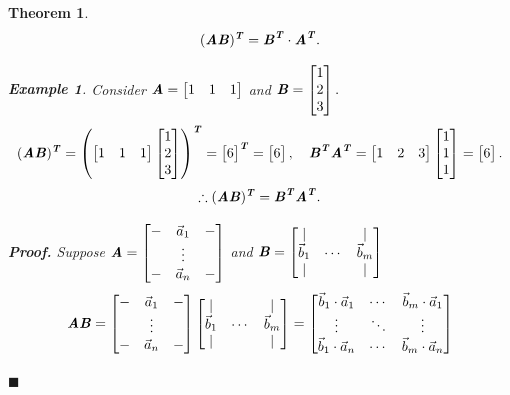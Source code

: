 \documentclass[12pt, a4paper]{article}
\newtheorem{thm}{Theorem}[subsection]
\newtheorem{eg}{Example}[subsection]
\newenvironment*{prf}{\indent\textbf{\textit{Proof. }}}{\hfill $\blacksquare$\par}
\def\T{{\textbf{\emph{T}}}}
\def\veca{\vec{a}}
\def\vecb{\vec{b}}
\def\matrixA{\textbf{\emph{A}}}
\def\matrixB{\textbf{\emph{B}}}
\begin{document}
\begin{thm}
	\[(\matrixA\matrixB)^\T=\matrixB^\T\cdot\matrixA^\T.\]	
	\begin{eg}
		Consider $\matrixA=\begin{bmatrix}1&1&1\end{bmatrix}$ and $\matrixB=\begin{bmatrix}1\\2\\3\end{bmatrix}.$
		\[(\matrixA\matrixB)^\T=\left(\begin{bmatrix}1&1&1\end{bmatrix}\begin{bmatrix}1\\2\\3\end{bmatrix}\right)^\T=\begin{bmatrix}6\end{bmatrix}^\T=\begin{bmatrix}6\end{bmatrix},\quad\matrixB^\T\matrixA^\T=\begin{bmatrix}1&2&3\end{bmatrix}\begin{bmatrix}1\\1\\1\end{bmatrix}=\begin{bmatrix}6\end{bmatrix}.\]	
		\[\therefore(\matrixA\matrixB)^\T=\matrixB^\T\matrixA^\T.\]
	\end{eg}
	\begin{prf}
		Suppose $\matrixA=\begin{bmatrix}-&\veca_1&-\\&\vdots&\\-&\veca_n&-\end{bmatrix}$ and $\matrixB=\begin{bmatrix}|&&|\\\vecb_1&\cdots&\vecb_m\\|&&|\end{bmatrix}$
		\[\matrixA\matrixB=\begin{bmatrix}-&\veca_1&-\\&\vdots&\\-&\veca_n&-\end{bmatrix}\begin{bmatrix}|&&|\\\vecb_1&\cdots&\vecb_m\\|&&|\end{bmatrix}=\begin{bmatrix}\vecb_1\cdot\veca_1&\cdots&\vecb_m\cdot\veca_1\\\vdots&\ddots&\vdots\\\vecb_1\cdot\veca_n&\cdots&\vecb_m\cdot\veca_n\end{bmatrix}\]

\end{prf}
\end{thm}
\end{document}
